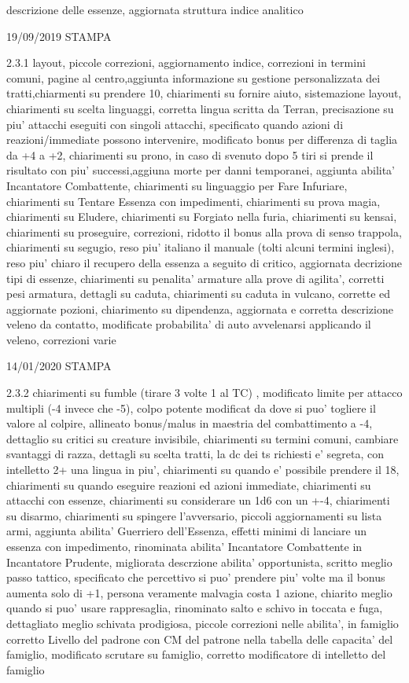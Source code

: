 \documentclass[a4paper,11pt,twoside,openany]{book}
\begin{document}
{{descrizione delle essenze, aggiornata struttura indice analitico
			
			19/09/2019 STAMPA
			
			2.3.1 layout, piccole correzioni, aggiornamento indice, correzioni in termini comuni, pagine al centro,aggiunta informazione su gestione personalizzata dei tratti,chiarmenti su prendere 10, chiarimenti su fornire aiuto, sistemazione layout, chiarimenti su scelta linguaggi, corretta lingua scritta da Terran, precisazione su piu' attacchi eseguiti con singoli attacchi, specificato quando azioni di reazioni/immediate possono intervenire, modificato bonus per differenza di taglia da +4 a +2, chiarimenti su prono, in caso di svenuto dopo 5 tiri si prende il risultato con piu' successi,aggiuna morte per danni temporanei, aggiunta abilita' Incantatore Combattente, chiarimenti su linguaggio per Fare Infuriare, chiarimenti su Tentare Essenza con impedimenti, chiarimenti su prova magia, chiarimenti su Eludere, chiarimenti su Forgiato nella furia, chiarimenti su kensai, chiarimenti su proseguire, correzioni, ridotto il bonus alla prova di senso trappola, chiarimenti su segugio, reso piu' italiano il manuale (tolti alcuni termini inglesi), reso piu' chiaro il recupero della essenza a seguito di critico, aggiornata decrizione tipi di essenze, chiarimenti su penalita' armature alla prove di agilita', corretti pesi armatura, dettagli su caduta, chiarimenti su caduta in vulcano, corrette ed aggiornate pozioni, chiarimento su dipendenza, aggiornata e corretta descrizione veleno da contatto, modificate probabilita' di auto avvelenarsi applicando il veleno, correzioni varie
			
			14/01/2020 STAMPA
			
			2.3.2 chiarimenti su fumble (tirare 3 volte 1 al TC) , modificato limite per attacco multipli (-4 invece che -5), colpo potente modificat da dove si puo' togliere il valore al colpire, allineato bonus/malus in maestria del combattimento a -4, dettaglio su critici su creature invisibile, chiarimenti su termini comuni, cambiare svantaggi di razza, dettagli su scelta tratti, la dc dei ts richiesti e' segreta, con intelletto 2+ una lingua in piu', chiarimenti su quando e' possibile prendere il 18, chiarimenti su quando eseguire reazioni ed azioni immediate, chiarimenti su attacchi con essenze, chiarimenti su considerare un 1d6 con un +-4, chiarimenti su disarmo, chiarimenti su spingere l'avversario, piccoli aggiornamenti su lista armi, aggiunta abilita' Guerriero dell'Essenza, effetti minimi di lanciare un essenza con impedimento, rinominata abilita' Incantatore Combattente in Incantatore Prudente, migliorata descrzione abilita' opportunista, scritto meglio passo tattico, specificato che percettivo si puo' prendere piu' volte ma il bonus aumenta solo di +1, persona veramente malvagia costa 1 azione, chiarito meglio quando si puo' usare rappresaglia, rinominato salto e schivo in toccata e fuga, dettagliato meglio schivata prodigiosa, piccole correzioni nelle abilita', in famiglio corretto Livello del padrone con CM del patrone nella tabella delle capacita' del famiglio, modificato scrutare su famiglio, corretto modificatore di intelletto del famiglio
			
}}
\end{document}

